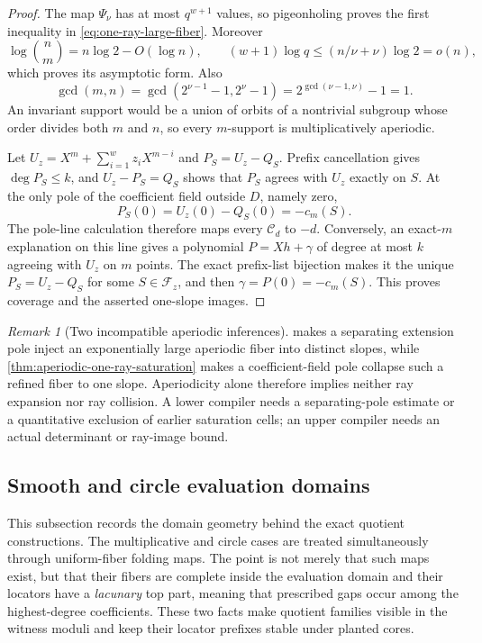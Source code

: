 \documentclass[11pt,a4paper]{amsart}
\numberwithin{equation}{section}
\theoremstyle{remark}
\newtheorem{remark}[remark]{Remark}
\newcommand{\Ccal}{\mathcal C}
\newcommand{\Fcal}{\mathcal F}
\begin{document}
\begin{proof}
The map \(\Psi_\nu\) has at most \(q^{w+1}\) values, so pigeonholing
proves the first inequality in \eqref{eq:one-ray-large-fiber}.  Moreover
\[
 \log\binom nm=n\log2-O(\log n),\qquad
 (w+1)\log q\le(n/\nu+\nu)\log2=o(n),
\]
which proves its asymptotic form.  Also
\[
 \gcd(m,n)=\gcd(2^{\nu-1}-1,2^\nu-1)
           =2^{\gcd(\nu-1,\nu)}-1=1.
\]
An invariant support would be a union of orbits of a nontrivial subgroup
whose order divides both \(m\) and \(n\), so every \(m\)-support is
multiplicatively aperiodic.

Let \(U_z=X^m+\sum_{i=1}^wz_iX^{m-i}\) and
\(P_S=U_z-Q_S\).  Prefix cancellation gives \(\deg P_S\le k\), and
\(U_z-P_S=Q_S\) shows that \(P_S\) agrees with \(U_z\) exactly on \(S\).
At the only pole of the coefficient field outside \(D\), namely zero,
\[
                     P_S(0)=U_z(0)-Q_S(0)=-c_m(S).
\]
The pole-line calculation therefore maps every \(\Ccal_d\) to \(-d\).
Conversely, an exact-\(m\) explanation on this line gives a polynomial
\(P=Xh+\gamma\) of degree at most \(k\) agreeing with \(U_z\) on
\(m\) points.  The exact prefix-list bijection makes it the unique
\(P_S=U_z-Q_S\) for some \(S\in\Fcal_z\), and then
\(\gamma=P(0)=-c_m(S)\).  This proves coverage and the asserted
one-slope images.
\end{proof}

\begin{remark}[Two incompatible aperiodic inferences]
\label{rem:two-aperiodic-ray-extremes}
 makes a separating extension pole
inject an exponentially large aperiodic fiber into distinct slopes, while
\cref{thm:aperiodic-one-ray-saturation} makes a coefficient-field pole collapse
such a refined fiber to one slope.  Aperiodicity alone therefore implies
neither ray expansion nor ray collision.  A lower compiler needs a
separating-pole estimate or a quantitative exclusion of earlier saturation
cells; an upper compiler needs an actual determinant or ray-image bound.
\end{remark}

\subsection{Smooth and circle evaluation domains}\label{sec:smooth-circle-domains}

This subsection records the domain geometry behind the exact quotient
constructions.  The multiplicative and circle cases are treated simultaneously through
uniform-fiber folding maps.  The point is not merely that such maps exist,
but that their fibers are complete inside the evaluation domain and their
locators have a \emph{lacunary} top part, meaning that prescribed gaps occur
among the highest-degree coefficients.  These two facts make quotient
families visible in the witness moduli and keep their locator prefixes
stable under planted cores.
\end{document}
